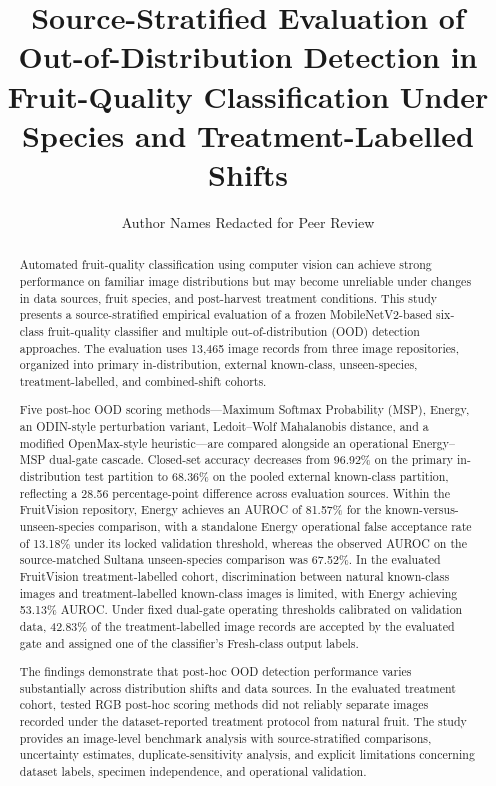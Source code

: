 \documentclass[3p,times,procedia]{elsarticle}
\begin{document}
\begin{frontmatter}


\title{Source-Stratified Evaluation of Out-of-Distribution Detection in Fruit-Quality Classification Under Species and Treatment-Labelled Shifts}

\author[a]{Author Names Redacted for Peer Review}
\address[a]{Affiliation Details Redacted for Double-Blind Peer Review}

\begin{abstract}
Automated fruit-quality classification using computer vision can achieve strong performance on familiar image distributions but may become unreliable under changes in data sources, fruit species, and post-harvest treatment conditions. This study presents a source-stratified empirical evaluation of a frozen MobileNetV2-based six-class fruit-quality classifier and multiple out-of-distribution (OOD) detection approaches. The evaluation uses 13,465 image records from three image repositories, organized into primary in-distribution, external known-class, unseen-species, treatment-labelled, and combined-shift cohorts.

Five post-hoc OOD scoring methods---Maximum Softmax Probability (MSP), Energy, an ODIN-style perturbation variant, Ledoit--Wolf Mahalanobis distance, and a modified OpenMax-style heuristic---are compared alongside an operational Energy--MSP dual-gate cascade. Closed-set accuracy decreases from 96.92\% on the primary in-distribution test partition to 68.36\% on the pooled external known-class partition, reflecting a 28.56 percentage-point difference across evaluation sources. Within the FruitVision repository, Energy achieves an AUROC of 81.57\% for the known-versus-unseen-species comparison, with a standalone Energy operational false acceptance rate of 13.18\% under its locked validation threshold, whereas the observed AUROC on the source-matched Sultana unseen-species comparison was 67.52\%. In the evaluated FruitVision treatment-labelled cohort, discrimination between natural known-class images and treatment-labelled known-class images is limited, with Energy achieving 53.13\% AUROC. Under fixed dual-gate operating thresholds calibrated on validation data, 42.83\% of the treatment-labelled image records are accepted by the evaluated gate and assigned one of the classifier's Fresh-class output labels.

The findings demonstrate that post-hoc OOD detection performance varies substantially across distribution shifts and data sources. In the evaluated treatment cohort, tested RGB post-hoc scoring methods did not reliably separate images recorded under the dataset-reported treatment protocol from natural fruit. The study provides an image-level benchmark analysis with source-stratified comparisons, uncertainty estimates, duplicate-sensitivity analysis, and explicit limitations concerning dataset labels, specimen independence, and operational validation.
\end{abstract}


\end{frontmatter}
\end{document}

